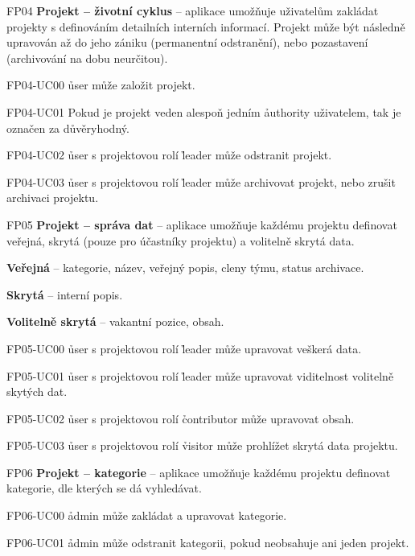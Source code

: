 \begin{dl}
   \item[FP04]
   \textbf{Projekt – životní cyklus} – aplikace umožňuje uživatelům zakládat projekty s definováním detailních interních informací.
   Projekt může být následně upravován až do jeho zániku (permanentní odstranění), nebo pozastavení (archivování na dobu neurčitou).
   \begin{dl}
      \item[FP04-UC00] \h{user} může založit projekt.
      \item[FP04-UC01] Pokud je projekt veden alespoň jedním \h{authority} uživatelem, tak je označen za důvěryhodný.
      \item[FP04-UC02] \h{user} s projektovou rolí \h{leader} může odstranit projekt.
      \item[FP04-UC03] \h{user} s projektovou rolí \h{leader} může archivovat projekt, nebo zrušit archivaci projektu.
   \end{dl}

   \item[FP05]
   \textbf{Projekt – správa dat} – aplikace umožňuje každému projektu definovat veřejná, skrytá (pouze pro účastníky projektu) a volitelně skrytá data.
   \begin{ul}
      \item \textbf{Veřejná} – kategorie, název, veřejný popis, cleny týmu, status archivace.
      \item \textbf{Skrytá} – interní popis.
      \item \textbf{Volitelně skrytá} – vakantní pozice, obsah.
   \end{ul}
   \begin{dl}
      \item[FP05-UC00] \h{user} s projektovou rolí \h{leader} může upravovat veškerá data.
      \item[FP05-UC01] \h{user} s projektovou rolí \h{leader} může upravovat viditelnost volitelně skytých dat.
      \item[FP05-UC02] \h{user} s projektovou rolí \h{contributor} může upravovat obsah.
      \item[FP05-UC03] \h{user} s projektovou rolí \h{visitor} může prohlížet skrytá data projektu.
   \end{dl}

   \item[FP06]
   \textbf{Projekt – kategorie} – aplikace umožňuje každému projektu definovat kategorie, dle kterých se dá vyhledávat.
   \begin{dl}
      \item[FP06-UC00] \h{admin} může zakládat a upravovat kategorie.
      \item[FP06-UC01] \h{admin} může odstranit kategorii, pokud neobsahuje ani jeden projekt.
   \end{dl}


\end{dl}
